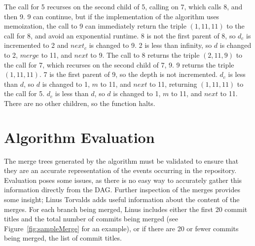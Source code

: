 The call for 5 recurses on the second child of 5, calling on 7, which
calls 8, and then 9. 9 can continue, but if the implementation of the
algorithm uses memoization, the call to 9 can immediately return the
triple $(1, 11, 11)$ to the call for 8, and avoid an exponential
runtime. 8 is not the first parent of 8, so $d_c$ is incremented to 2
and $next_c$ is changed to 9. 2 is less than infinity, so $d$ is changed
to 2, $merge$ to 11, and $next$ to 9. The call to 8 returns the triple
$(2, 11, 9)$ to the call for 7, which recurses on the second child of 7,
9. 9 returns the triple $(1, 11, 11)$. 7 is the first parent of 9, so
the depth is not incremented. $d_c$ is less than $d$, so $d$ is changed
to 1, $m$ to 11, and $next$ to 11, returning $(1, 11, 11)$ to the call
for 5. $d_c$ is less than $d$, so $d$ is changed to 1, $m$ to 11, and
$next$ to 11. There are no other children, so the function halts.

\section{Algorithm Evaluation}
\label{sec:algorithm_evaluation}

The merge trees generated by the algorithm must be validated to ensure
that they are an accurate representation of the events occurring in the
repository.
Evaluation poses some issues, as there is no easy way to accurately
gather this information directly from the DAG\@.
Further inspection of the merges provides some insight;
Linus Torvalds adds useful information about the
content of the merges.
For each branch being merged,
Linus includes either the first 20 commit titles and the total
number of commits being merged (see Figure~\ref{fig:sampleMerge}
for an example),
or if there are 20 or fewer commits being merged, the list of commit
titles.

